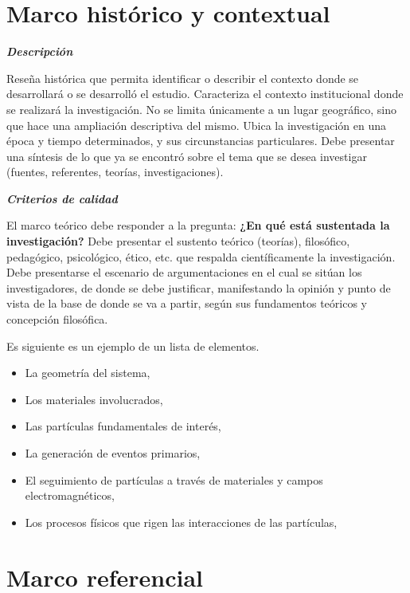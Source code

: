 
\section{Marco histórico y contextual}

    \textbf{\textit{Descripción}}
    
    Reseña histórica que permita identificar o describir el contexto donde se desarrollará o se desarrolló el estudio.
    Caracteriza el contexto institucional donde se realizará la investigación. No se limita únicamente a un lugar geográfico, sino que hace una ampliación descriptiva del mismo.
    Ubica la investigación en una época y tiempo determinados, y sus circunstancias particulares.
    Debe presentar una síntesis de lo que ya se encontró sobre el tema que se desea investigar (fuentes, referentes, teorías, investigaciones).
    
    \textbf{\textit{Criterios de calidad}}
    
    El marco teórico debe responder a la pregunta: \textbf{¿En qué está sustentada la investigación?}
    Debe presentar el sustento teórico (teorías), filosófico, pedagógico, psicológico, ético, etc. que respalda científicamente la investigación.
    Debe presentarse el escenario de argumentaciones en el cual se sitúan los investigadores, de donde se debe justificar, manifestando la opinión y punto de vista de la base de donde se va a partir, según sus fundamentos teóricos y concepción filosófica.
    
    Es siguiente es un ejemplo de un lista de elementos.
    
    \begin{itemize}
        \item La geometría del sistema,
        \item Los materiales involucrados,
        \item Las partículas fundamentales de interés,
        \item La generación de eventos primarios,
        \item El seguimiento de partículas a través de materiales y campos electromagnéticos,
        \item Los procesos físicos que rigen las interacciones de las partículas,
    \end{itemize}

\section{Marco referencial}

